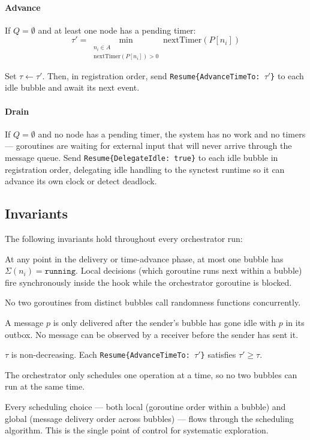 \documentclass[11pt]{article}
\begin{document}
\paragraph{Advance}
If $Q = \emptyset$ and at least one node has a pending timer:
\[
\tau' = \min_{\substack{n_i \in A \\ \text{nextTimer}(P[n_i]) > 0}} \text{nextTimer}(P[n_i])
\]

Set $\tau \leftarrow \tau'$. Then, in registration order, send \texttt{Resume\{AdvanceTimeTo: $\tau'$\}} to each idle bubble and await its next event.

\paragraph{Drain}
If $Q = \emptyset$ and no node has a pending timer, the system has no work and no timers --- goroutines are waiting for external input that will never arrive through the message queue. Send \texttt{Resume\{DelegateIdle: true\}} to each idle bubble in registration order, delegating idle handling to the synctest runtime so it can advance its own clock or detect deadlock.

\subsection{Invariants}

The following invariants hold throughout every orchestrator run:

\begin{description}[leftmargin=0pt,labelindent=0pt]
    \item[\textbf{I1 --- At most one active bubble.}] At any point in the delivery or time-advance phase, at most one bubble has $\Sigma(n_i) = \texttt{running}$. Local decisions (which goroutine runs next within a bubble) fire synchronously inside the hook while the orchestrator goroutine is blocked.
    \item[\textbf{I2 --- Sequential rand access.}] No two goroutines from distinct bubbles call randomness functions concurrently.
    \item[\textbf{I3 --- Message causality.}] A message $p$ is only delivered after the sender's bubble has gone idle with $p$ in its outbox. No message can be observed by a receiver before the sender has sent it.
    \item[\textbf{I4 --- Monotone clock.}] $\tau$ is non-decreasing. Each \texttt{Resume\{AdvanceTimeTo: $\tau'$\}} satisfies $\tau' \geq \tau$.
    \item[\textbf{I5 --- No concurrent operations.}] The orchestrator only schedules one operation at a time, so no two bubbles can run at the same time.
    \item[\textbf{I6 --- Algorithm controls all decisions.}] Every scheduling choice --- both local (goroutine order within a bubble) and global (message delivery order across bubbles) --- flows through the scheduling algorithm. This is the single point of control for systematic exploration.
\end{description}
\end{document}

